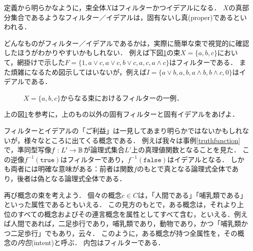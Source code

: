 \documentclass[11pt,a4paper, dvipdfmx]{jsarticle}
\begin{document}
定義から明らかなように，束全体$X$はフィルターかつイデアルになる．
$X$の真部分集合であるようなフィルター／イデアルは，固有ないし真(proper)であるといわれる．

どんなものがフィルター／イデアルであるかは，実際に簡単な束で視覚的に確認したほうがわかりやすいかもしれない．
例えば下図\ref{fig:3bool}の束$X = \{ a, b, c\}$において，網掛けで示した$F =\{ 1, a\vee c, a\vee c, b\vee c, a, c, a \wedge c\}$はフィルターである．
また煩雑になるため図示してはいないが，例えば$I =\{ a \vee b, a, b, a\wedge b, b \wedge c, 0 \}$はイデアルである．
\begin{figure}[h]
    \centering
    \caption{$X = \{a, b, c\}$からなる束におけるフィルターの一例．}
    \label{fig:3bool} 
\end{figure}

\begin{exercise}
上の図\ref{fig:3bool}を参考に，上のもの以外の固有フィルターと固有イデアルをあげよ．
\end{exercise}

フィルターとイデアルの「ご利益」は一見してあまり明らかではないかもしれないが，様々なところに出てくる概念である．
例えば我々は事例\ref{truthfunction}で，準同型写像$f:L' \to \mathbb{B}$が論理式集合$L'$上の真理値関数となることを見た．
この逆像$f^{-1}(\texttt{true})$はフィルターであり，$f^{-1}(\texttt{false})$はイデアルとなる．
しかも両者には明確な意味がある：前者は関数$f$のもとで真となる論理式全体であり，後者は偽となる論理式全体である．

\begin{example}[概念の内包]
再び概念の束を考えよう．
個々の概念$c \in C$は，「人間である」「哺乳類である」といった属性であるともいえる．
この見方のもとで，ある概念は，それより上位のすべての概念およびその連言概念を属性としてすべて含む，といえる．例えば人間であれば，二足歩行であり，哺乳類であり，動物であり，かつ「哺乳類かつ二足歩行」でもあり，云々．
このように，ある概念が持つ全属性を，その概念の\emph{内包}(intent)と呼ぶ．
内包はフィルターである．
\end{example}
\end{document}
